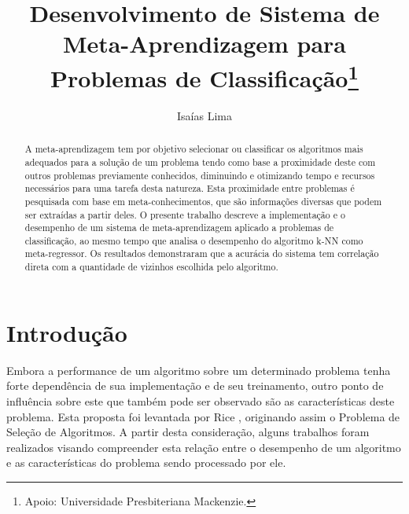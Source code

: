 \documentclass[runningheads]{llncs}
\begin{document}
\title{Desenvolvimento de Sistema de Meta-Aprendizagem para Problemas de Classificação\thanks{Apoio: Universidade Presbiteriana Mackenzie.}}


\author{Isaías Lima}



\maketitle

\begin{abstract}
A meta-aprendizagem tem por objetivo selecionar ou classificar os algoritmos mais adequados para a solução de um problema tendo como base a proximidade deste com outros problemas previamente conhecidos, diminuindo e otimizando tempo e recursos necessários para uma tarefa desta natureza. Esta proximidade entre problemas é pesquisada com base em meta-conhecimentos, que são informações diversas que podem ser extraídas a partir deles. O presente trabalho descreve a implementação e o desempenho de um sistema de meta-aprendizagem aplicado a problemas de classificação, ao mesmo tempo que analisa o desempenho do algoritmo k-NN como meta-regressor. Os resultados demonstraram que a acurácia do sistema tem correlação direta com a quantidade de vizinhos escolhida pelo algoritmo.

\end{abstract}

\section{Introdução}

Embora a performance de um algoritmo sobre um determinado problema tenha forte dependência de sua implementação e de seu treinamento, outro ponto de influência sobre este que também pode ser observado são as características deste problema. Esta proposta foi levantada por Rice \cite{rice}, originando assim o Problema de Seleção de Algoritmos. A partir desta consideração, alguns trabalhos foram realizados visando compreender esta relação entre o desempenho de um algoritmo e as características do problema sendo processado por ele.
\end{document}
